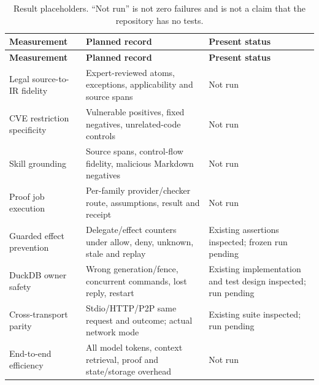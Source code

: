 \begingroup
\renewcommand{\thetable}{E1}
\begin{longtable}{@{}>{\raggedright\arraybackslash}p{.24\linewidth} >{\raggedright\arraybackslash}p{.32\linewidth} >{\raggedright\arraybackslash}p{.38\linewidth}@{}}
\caption{Result placeholders. ``Not run'' is not zero failures and is not a claim that the repository has no tests.}\label{tab:E1}\\
\toprule
\textbf{Measurement} & \textbf{Planned record} & \textbf{Present status} \\
\midrule
\endfirsthead
\textbf{Measurement} & \textbf{Planned record} & \textbf{Present status} \\
\midrule
\endhead
\bottomrule
\endlastfoot
Legal source-to-IR fidelity & Expert-reviewed atoms, exceptions, applicability and source spans & Not run \\[3pt]
CVE restriction specificity & Vulnerable positives, fixed negatives, unrelated-code controls & Not run \\[3pt]
Skill grounding & Source spans, control-flow fidelity, malicious Markdown negatives & Not run \\[3pt]
Proof job execution & Per-family provider/checker route, assumptions, result and receipt & Not run \\[3pt]
Guarded effect prevention & Delegate/effect counters under allow, deny, unknown, stale and replay & Existing assertions inspected; frozen run pending \\[3pt]
DuckDB owner safety & Wrong generation/fence, concurrent commands, lost reply, restart & Existing implementation and test design inspected; run pending \\[3pt]
Cross-transport parity & Stdio/HTTP/P2P same request and outcome; actual network mode & Existing suite inspected; run pending \\[3pt]
End-to-end efficiency & All model tokens, context retrieval, proof and state/storage overhead & Not run \\[3pt]
\end{longtable}
\endgroup
